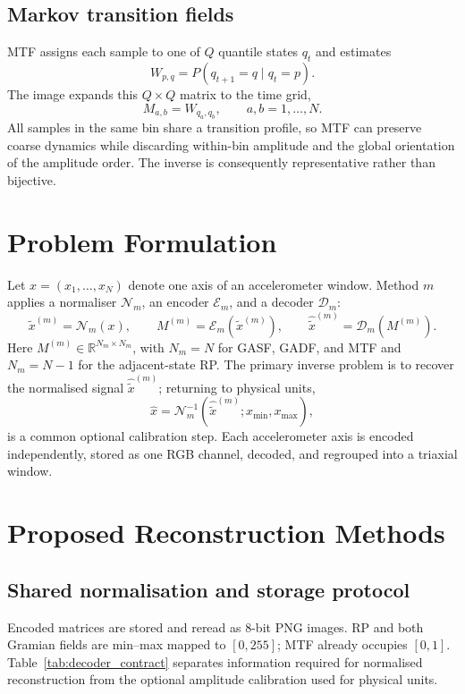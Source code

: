 \documentclass[10pt,a4paper,parskip=half-]{scrartcl}
\begin{document}
\subsection{Markov transition fields}
\label{sec:mtf_definition}
MTF assigns each sample to one of \(Q\) quantile states \(q_t\) and estimates
\[
W_{p,q}=P(q_{t+1}=q\mid q_t=p).
\]
The image expands this \(Q\times Q\) matrix to the time grid,
\[

M_{a,b}=W_{q_a,q_b},\qquad a,b=1,\ldots,N.
\]
All samples in the same bin share a transition profile, so MTF can preserve coarse dynamics while discarding within-bin amplitude and the global orientation of the amplitude order. The inverse is consequently representative rather than bijective.
\section{Problem Formulation}
\label{sec:problem_formulation}


Let \(x=(x_1,\ldots,x_N)\) denote one axis of an accelerometer window. Method \(m\) applies a normaliser \(\mathcal N_m\), an encoder \(\mathcal E_m\), and a decoder \(\mathcal D_m\):
\[
\tilde x^{(m)}=\mathcal N_m(x),\qquad
M^{(m)}=\mathcal E_m(\tilde x^{(m)}),\qquad
\hat{\tilde x}^{(m)}=\mathcal D_m(M^{(m)}).
\]
Here \(M^{(m)}\in\mathbb R^{N_m\times N_m}\), with \(N_m=N\) for GASF, GADF, and MTF and \(N_m=N-1\) for the adjacent-state RP. The primary inverse problem is to recover the normalised signal \(\hat{\tilde x}^{(m)}\); returning to physical units,
\[
\hat x=\mathcal N_m^{-1}(\hat{\tilde x}^{(m)};x_{\min},x_{\max}),
\]
is a common optional calibration step. Each accelerometer axis is encoded independently, stored as one RGB channel, decoded, and regrouped into a triaxial window.

\section{Proposed Reconstruction Methods}
\label{sec:proposed_methods}

\subsection{Shared normalisation and storage protocol}
\label{sec:shared_protocol}

Encoded matrices are stored and reread as 8-bit PNG images. RP and both Gramian fields are min--max mapped to \([0,255]\); MTF already occupies \([0,1]\). Table~\ref{tab:decoder_contract} separates information required for normalised reconstruction from the optional amplitude calibration used for physical units.
\end{document}

